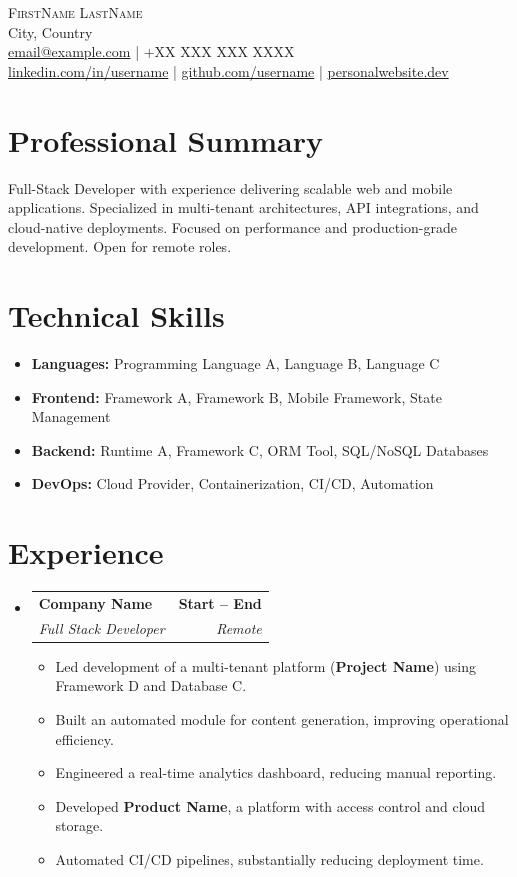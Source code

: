 \documentclass[letterpaper,11pt]{article}
\makeatletter
\newcommand{\resumeItem}[1]{\item\small{{#1}}}
\newcommand{\resumeSubheading}[4]{\vspace{-2pt}\item
  \begin{tabular*}{1.0\textwidth}[t]{l@{\extracolsep{\fill}}r}
    \textbf{#1} & \textbf{\small #2} \\
    \textit{\small#3} & \textit{\small #4} \\
  \end{tabular*}\vspace{-7pt}}
\newcommand{\resumeItemListStart}{\begin{itemize}[leftmargin=0.15in]}
\newcommand{\resumeItemListEnd}{\end{itemize}}
\newcommand{\resumeSubHeadingListStart}{\begin{itemize}[leftmargin=0.0in, label={}]}
\newcommand{\resumeSubHeadingListEnd}{\end{itemize}}
\makeatother
\begin{document}
\begin{center}
  {\Huge \scshape FirstName LastName} \\ \vspace{3pt}
  City, Country \\ \vspace{3pt}
  \href{mailto:email@example.com}{email@example.com} \quad | \quad +XX XXX XXX XXXX \\ \vspace{3pt}
  \href{https://linkedin.com/in/username}{linkedin.com/in/username} \quad | \quad
  \href{https://github.com/username}{github.com/username} \quad | \quad
  \href{https://personalwebsite.dev/}{personalwebsite.dev}
\end{center}

\section{Professional Summary}
Full-Stack Developer with experience delivering scalable web and mobile applications. Specialized in multi-tenant architectures, API integrations, and cloud-native deployments. Focused on performance and production-grade development. Open for remote roles.

\section{Technical Skills}
\resumeItemListStart
  \resumeItem{\textbf{Languages:} Programming Language A, Language B, Language C}
  \resumeItem{\textbf{Frontend:} Framework A, Framework B, Mobile Framework, State Management}
  \resumeItem{\textbf{Backend:} Runtime A, Framework C, ORM Tool, SQL/NoSQL Databases}
  \resumeItem{\textbf{DevOps:} Cloud Provider, Containerization, CI/CD, Automation}
\resumeItemListEnd

\section{Experience}
\resumeSubHeadingListStart
  \resumeSubheading
    {Company Name}{Start -- End}
    {Full Stack Developer}{Remote}
    \resumeItemListStart
      \resumeItem{Led development of a multi-tenant platform (\textbf{Project Name}) using Framework D and Database C.}
      \resumeItem{Built an automated module for content generation, improving operational efficiency.}
      \resumeItem{Engineered a real-time analytics dashboard, reducing manual reporting.}
      \resumeItem{Developed \textbf{Product Name}, a platform with access control and cloud storage.}
      \resumeItem{Automated CI/CD pipelines, substantially reducing deployment time.}
    \resumeItemListEnd
\resumeSubHeadingListEnd
\end{document}
